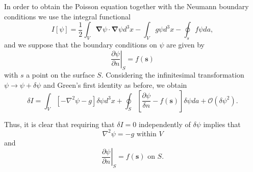  In order to obtain the Poisson equation together with the Neumann boundary conditions we use the integral functional
 \begin{equation}
I[\psi] = \frac{1}{2} \int_V \boldsymbol{\nabla} \psi \cdot \boldsymbol{\nabla} \psi d^3x - \int_V g\psi d^3x - \oint_s f \psi da,
\end{equation}
and we suppose that the boundary conditions on $\psi$ are given by
\begin{equation}
 \left. \frac{\partial \psi}{\partial n} \right|_S  = f(\textbf{s})
\end{equation} 
with $s$ a point on the surface $S$. Considering the infinitesimal transformation $\psi \rightarrow \psi + \delta \psi $ and Green's first identity as before, we obtain
\begin{equation}
\delta I =  \int_V \left[  - \nabla ^2 \psi - g \right] \delta \psi d^3x + \oint_S \left[ \frac{\partial \psi}{\delta n} - f(\textbf{s}) \right]\delta \psi  da + \mathcal{O} (\delta \psi ^2).
\end{equation}

Thus, it is clear that requiring that $\delta I = 0$ independently of $\delta \psi$ implies that
\begin{equation}
 \nabla^2 \psi = -g \textrm{ within }V
 \end{equation} 
 and
\begin{equation}
 \left. \frac{\partial \psi}{\partial n} \right|_S  = f(\textbf{s}) \textrm{ on }S.
\end{equation} 
